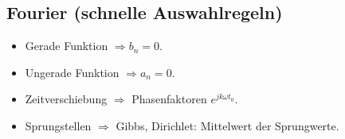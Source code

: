 \subsection{Fourier (schnelle Auswahlregeln)}

\begin{itemize}
\item Gerade Funktion $\Rightarrow b_n=0$.
\item Ungerade Funktion $\Rightarrow a_n=0$.
\item Zeitverschiebung $\Rightarrow$ Phasenfaktoren $e^{jk\omega t_0}$.
\item Sprungstellen $\Rightarrow$ Gibbs, Dirichlet: Mittelwert der Sprungwerte.
\end{itemize}

